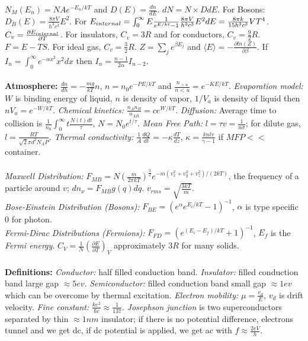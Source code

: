 $N_M(E_n)= N A e^{-E_n / kT}$ and $D(E)= {\frac {dn} {dE}}$.  $dN = N \times D dE$.
For Bosons:
$D_B(E)= {\frac {8 \pi V} {h^3 c^3}} E^2$.  For
$E_{\small{internal}}= \int_0^{\infty} E {\frac 1 {e^{E/kt} -1}} {\frac {8 \pi V} {h^3 c^3}}
E^2 dE = {\frac {8 \pi k } {15 h^3 c^3}} V T^4$.
$C_v = {\frac {\partial E_{\small{internal}}} {\partial T}}$.
For insulators, $C_v= 3R$ and
for conductors, $C_v= {\frac 9 2}R$.  $F= E-TS$.
For ideal gas, $C_v= {\frac {3}{2}}R$.
$Z= \sum_j e^{\beta E_j}$ and $\langle E \rangle = -{\frac {\partial ln(Z)} {\partial \beta}}$.
If $I_n= \int_{0}^{\infty} e^{-\alpha x^2} x^2 dx$ then $I_n= {\frac {n-1} {2 \alpha}} I_{n-2}$.
\\
\\
{\bf Atmosphere:}
${\frac {dn} {dh}}= -{\frac {mg} {kT}}n$, $n= n_0 e^{-PE/kT}$ and
${\frac {n_{>u}} {n<u}} = e^{-KE/kT}$.  \emph{Evaporation model:} 
$W$ is binding energy of 
liquid, $n$ is density of vapor, $1/V_a$ is density of liquid then $nV_a = e^{-W/kT}$.
\emph{Chemical kinetics:} ${\frac {n_A n_B} {n_{AB}}}= ce^{W/kT}$.  
\emph{Diffusion:} Average time to collision is 
${\frac 1 {n_0}} \int_0^{\infty} t {\frac {N(t) dt} {\tau}}$, $N=N_0 e^{t/ \tau}$.
\emph{Mean Free Path:}
$l= \tau v= {\frac 1 {n \sigma}}$; for dilute gas, 
$l= {\frac {RT}{{\sqrt 2} \pi d^2 N_A P}}$.
\emph{Thermal conductivity:} ${\frac 1 A} {\frac {dQ} {dt}} = - \kappa 
{\frac {dT} {dz}}$, $\kappa = {\frac {knlv} {\gamma-1}}$ if $MFP<<$ container.
\\
\\
\emph{Maxwell Distribution:}
$F_{MB}= N ({\frac {m} {2 \pi k T}})^{\frac 3 2} e^{-m (v_x^2+v_y^2+v_z^2)/(2kT)}$, the frequency
of a particle around $v$;  $dn_{\nu}= F_{MB} g(q) dq$.
$v_{rms}= {\sqrt {\frac {3kT} {m}}}$.
\\
\emph{Bose-Einstein Distribution (Bosons):}
$F_{BE}= (e^{\alpha} e^{E_i/kT} - 1)^{-1}$, $\alpha$ is type specific $0$ for photon.
\\
\emph{Fermi-Dirac Distributions (Fermions):}
$F_{FD}= (e^{(E_i-E_f)/kT} + 1)^{-1}$, $E_f$ is the \emph{Fermi energy}. 
$C_V= {\frac 1 N} ({\frac {\partial E} {\partial T}})_V$ approximately $3R$ for
many solids.
\\
\\
{\bf Definitions:}
\emph{Conductor:} half filled conduction band.  
\emph{Insulator:} filled conduction band large gap $\approx 5 ev$.
\emph{Semiconductor:} filled conduction band small gap $\approx 1 ev$ which can 
be overcome by thermal excitation.  
\emph{Electron mobility:} $\mu={\frac {v_d} {E}}$, $v_d$ is drift velocity.  
\emph{Fine constant:} ${\frac {ke^2} {\hbar c}} \approx {\frac 1 {137}}$.  
\emph{Josephson junction} is
two superconductors separated by thin $\approx 1 nm$ insulator; if there is no potential
difference, electrons tunnel and we get dc, if dc potential is applied, we get ac with
$f \approx {\frac {2eV}{h}}$.
